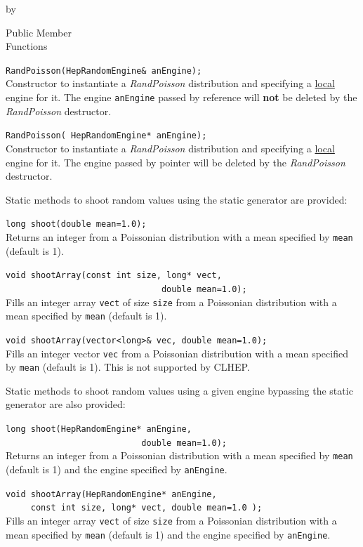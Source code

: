 \documentclass[twoside]{article}
\newcommand{\comp}[1]{\texttt{#1}}%
\newcommand{\entrylabel}[1]{\mbox{\textbf{{#1}}}\hfil}%
\newenvironment{entry}
{\begin{list}{}%
    {\renewcommand{\makelabel}{\entrylabel}%
     \setlength{\labelwidth}{90pt}%
     \setlength{\leftmargin}{\labelwidth}
     \advance\leftmargin by \labelsep%
      }%
    }%
  {\end{list}}
\newcommand{\Entrylabel}[1]%
{\raisebox{0pt}[1ex][0pt]{\makebox[\labelwidth][l]%
    {\parbox[t]{\labelwidth}{\hspace{0pt}\textbf{{#1}}}}}}
\newenvironment{Entry}%
{\renewcommand{\entrylabel}{\Entrylabel}\begin{entry}}%
  {\end{entry}}
\begin{document}
\begin{Entry}
\item[Public Member\\ Functions]

    \verb+RandPoisson(HepRandomEngine& anEngine);+\\
    Constructor to instantiate a {\em RandPoisson}
    distribution and specifying a \underline{local} engine for it.
    The engine \comp{anEngine} passed by reference will {\bf not}
    be deleted by the {\em RandPoisson} destructor.
  
    \verb+RandPoisson( HepRandomEngine* anEngine);+\\
    Constructor to instantiate a {\em RandPoisson}
    distribution and specifying a \underline{local} engine for it.
    The engine passed by pointer will be deleted by the {\em RandPoisson}
    destructor.

    Static methods to shoot random values using the static generator
    are provided:

    \verb+long shoot(double mean=1.0);+\\
    Returns an integer from a Poissonian distribution with a mean
    specified by \comp{mean} (default is 1).

    \verb+void shootArray(const int size, long* vect,+\\
    \verb+                               double mean=1.0);+\\
    Fills an integer array \comp{vect} of size \comp{size} from a
    Poissonian distribution with a mean specified by \comp{mean}
    (default is 1).

    \verb+void shootArray(vector<long>& vec, double mean=1.0);+\\
    Fills an integer vector \comp{vec} from a
    Poissonian distribution with a mean specified by \comp{mean}
    (default is 1).  This is not supported by CLHEP.

    Static methods to shoot random values using a given engine
    bypassing the static generator are also provided:

    \verb+long shoot(HepRandomEngine* anEngine,+\\
    \verb+                           double mean=1.0);+\\
    Returns an integer from a Poissonian distribution with a mean
    specified by \comp{mean} (default is 1) and the engine specified
    by \comp{anEngine}.
  
    \verb+void shootArray(HepRandomEngine* anEngine,+\\
    \verb+     const int size, long* vect, double mean=1.0 );+\\
    Fills an integer array \comp{vect} of size \comp{size} from a
    Poissonian distribution with a mean specified by \comp{mean}
    (default is 1) and the engine specified by \comp{anEngine}.


\end{Entry}
\end{document}
